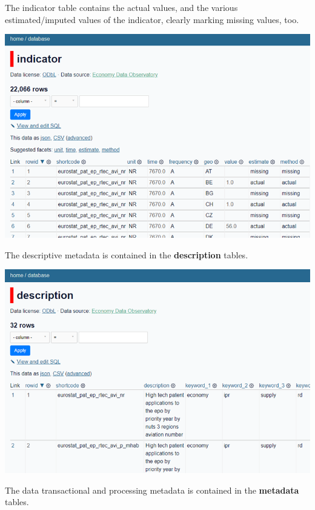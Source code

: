 \documentclass[
  a4paper,
  openany, a4paper, oneside]{book}
\begin{document}
The indicator table contains the actual values, and the various estimated/imputed values of the indicator, clearly marking missing values, too.

\begin{center}\includegraphics[width=11.11in]{plots/screenshots/EDO_API_indicator_table} \end{center}

The descriptive metadata is contained in the \textbf{description} tables.

\begin{center}\includegraphics[width=11.11in]{plots/screenshots/EDO_API_description_table} \end{center}

The data transactional and processing metadata is contained in the \textbf{metadata} tables.
\end{document}

